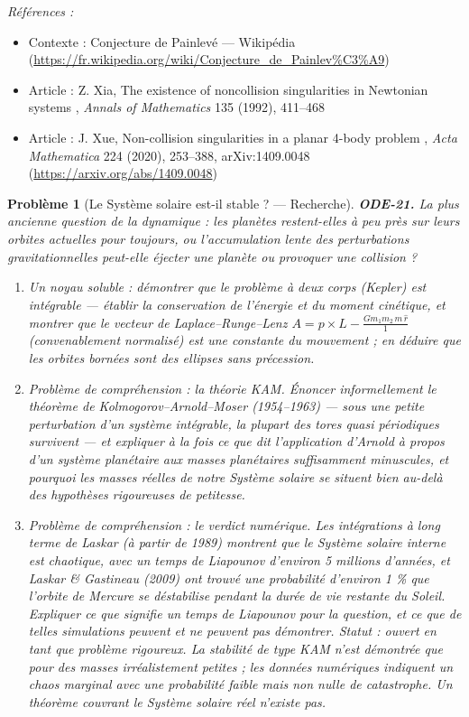 \documentclass[11pt]{article}
\newtheorem{problem}{Problème}
\newenvironment{refs}{\par\small\noindent\emph{Références :}\begin{itemize}\setlength\itemsep{0pt}}{\end{itemize}\normalsize}
\begin{document}
\begin{refs}
\item Contexte : Conjecture de Painlevé --- Wikipédia (\url{https://fr.wikipedia.org/wiki/Conjecture_de_Painlev%C3%A9})
\item Article : Z. Xia, \og{} The existence of noncollision singularities in Newtonian systems \fg{}, \textit{Annals of Mathematics} 135 (1992), 411--468
\item Article : J. Xue, \og{} Non-collision singularities in a planar 4-body problem \fg{}, \textit{Acta Mathematica} 224 (2020), 253--388, arXiv:1409.0048 (\url{https://arxiv.org/abs/1409.0048})
\end{refs}

\bigskip

\begin{problem}[{Le Système solaire est-il stable ? --- Recherche}]
\textbf{ODE-21.} La plus ancienne question de la dynamique : les planètes restent-elles à peu
près sur leurs orbites actuelles pour toujours, ou l'accumulation lente des perturbations
gravitationnelles peut-elle éjecter une planète ou provoquer une collision ?
\begin{enumerate}
\item[(a)] Un noyau soluble : démontrer que le problème à deux corps (Kepler) est intégrable --- établir
la conservation de l'énergie et du moment cinétique, et montrer que le vecteur de
Laplace--Runge--Lenz $ A = p \times L - \frac{G m_1 m_2\, m\, \hat{r}}{1} $ (convenablement
normalisé) est une constante du mouvement ; en déduire que les orbites bornées sont des ellipses
sans précession.
\item[(b)] Problème de compréhension : la théorie KAM. Énoncer informellement le théorème de
Kolmogorov--Arnold--Moser (1954--1963) --- sous une petite perturbation d'un système intégrable, la
plupart des tores quasi périodiques survivent --- et expliquer à la fois ce que dit l'application
d'Arnold à propos d'un système planétaire aux masses planétaires suffisamment minuscules, et
pourquoi les masses réelles de notre Système solaire se situent bien au-delà des hypothèses
rigoureuses de petitesse.
\item[(c)] Problème de compréhension : le verdict numérique. Les intégrations à long terme de Laskar
(à partir de 1989) montrent que le Système solaire interne est chaotique, avec un temps de
Liapounov d'environ 5 millions d'années, et Laskar \& Gastineau (2009) ont trouvé une
probabilité d'environ 1 \% que l'orbite de Mercure se déstabilise pendant la durée de vie restante
du Soleil. Expliquer ce que signifie un temps de Liapounov pour la question, et ce que de telles
simulations peuvent et ne peuvent pas démontrer.
\textit{Statut : ouvert en tant que problème rigoureux. La stabilité de type KAM n'est démontrée que
pour des masses irréalistement petites ; les données numériques indiquent un chaos marginal avec
une probabilité faible mais non nulle de catastrophe. Un théorème couvrant le Système solaire réel
n'existe pas.}
\end{enumerate}

\end{problem}
\end{document}

